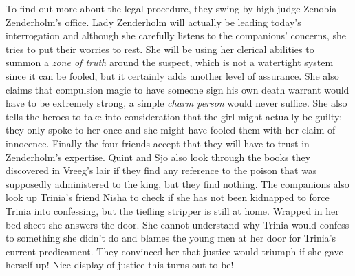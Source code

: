 To find out more about the legal procedure, they swing by high judge Zenobia Zenderholm's office. Lady Zenderholm will actually be leading today's interrogation and although she carefully listens to the companions' concerns, she tries to put their worries to rest. She will be using her clerical abilities to summon a {\itshape zone of truth} around the suspect, which is not a watertight system since it can be fooled, but it certainly adds another level of assurance. She also claims that compulsion magic to have someone sign his own death warrant would have to be extremely strong, a simple  {\itshape charm person} would never suffice. She also tells the heroes to take into consideration that the girl might actually be guilty: they only spoke to her once and she might have fooled them with her claim of innocence. Finally the four friends accept that they will have to trust in Zenderholm's expertise. Quint and Sjo also look through the books they discovered in Vreeg's lair if they find any reference to the poison that was supposedly administered to the king, but they find nothing. The companions also look up Trinia's friend Nisha to check if she has not been kidnapped to force Trinia into confessing, but the tiefling stripper is still at home. Wrapped in her bed sheet she answers the door. She cannot understand why Trinia would confess to something she didn't do and blames the young men at her door for Trinia's current predicament. They convinced her that justice would triumph if she gave herself up! Nice display of justice this turns out to be!\\

